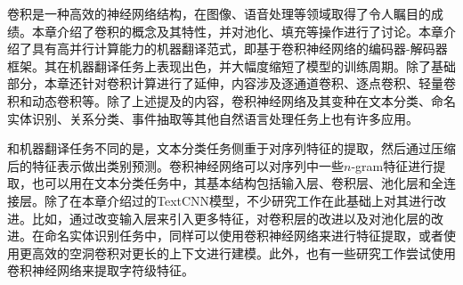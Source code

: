 \parinterval 卷积是一种高效的神经网络结构，在图像、语音处理等领域取得了令人瞩目的成绩。本章介绍了卷积的概念及其特性，并对池化、填充等操作进行了讨论。本章介绍了具有高并行计算能力的机器翻译范式，即基于卷积神经网络的编码器-解码器框架。其在机器翻译任务上表现出色，并大幅度缩短了模型的训练周期。除了基础部分，本章还针对卷积计算进行了延伸，内容涉及逐通道卷积、逐点卷积、轻量卷积和动态卷积等。除了上述提及的内容，卷积神经网络及其变种在文本分类、命名实体识别、关系分类、事件抽取等其他自然语言处理任务上也有许多应用。

\parinterval 和机器翻译任务不同的是，文本分类任务侧重于对序列特征的提取，然后通过压缩后的特征表示做出类别预测。卷积神经网络可以对序列中一些$n$-gram特征进行提取，也可以用在文本分类任务中，其基本结构包括输入层、卷积层、池化层和全连接层。除了在本章介绍过的TextCNN模型，不少研究工作在此基础上对其进行改进。比如，通过改变输入层来引入更多特征，对卷积层的改进以及对池化层的改进。在命名实体识别任务中，同样可以使用卷积神经网络来进行特征提取，或者使用更高效的空洞卷积对更长的上下文进行建模。此外，也有一些研究工作尝试使用卷积神经网络来提取字符级特征。








